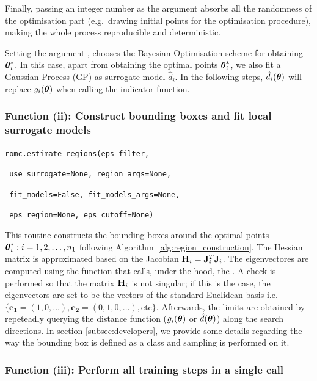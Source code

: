 Finally, passing an integer number as the argument 
absorbs all the randomness of the optimisation part (e.g.\ drawing
initial points for the optimisation procedure), making the whole
process reproducible and deterministic.

Setting the argument , chooses the Bayesian
Optimisation scheme for obtaining $\boldsymbol{\theta}_i^*$. In this case, apart
from obtaining the optimal points $\boldsymbol{\theta}_i^*$, we also fit a Gaussian
Process (GP) as surrogate model $\hat{d}_i$. In the following steps,
$\hat{d}_i(\boldsymbol{\theta})$ will replace $g_i(\boldsymbol{\theta})$ when calling the
indicator function.

\subsubsection*{Function (ii): Construct bounding boxes and fit local surrogate models}

\texttt{romc.estimate_regions(eps_filter,}
  
      \texttt{                      use_surrogate=None, region_args=None,}
  
      \texttt{                      fit_models=False, fit_models_args=None,}
  
      \texttt{                      eps_region=None, eps_cutoff=None)}
\vspace{5mm}

This routine constructs the bounding boxes around the optimal points
$\boldsymbol{\theta}_i^* : i = 1, 2, \ldots, n_1$ following
Algorithm~\ref{alg:region_construction}. The Hessian matrix is
approximated based on the Jacobian $\mathbf{H}_i = \mathbf{J}_i^T \mathbf{J}_i$. The
eigenvectores are computed using the function
 that calls, under the hood, the
. A check is performed so that the matrix
$\mathbf{H}_i$ is not singular; if this is the case, the eigenvectors are
set to be the vectors of the standard Euclidean basis i.e.\
$\{ \mathbf{e_1} = (1, 0, \ldots), \mathbf{e_2} = (0,1,0,\ldots),
\text{etc} \}$. Afterwards, the limits are obtained by repeteadly querying
the distance function ($g_i(\boldsymbol{\theta})$ or $\hat{d}(\boldsymbol{\theta})$) along the
search directions. In section \ref{subsec:developers}, we provide some
details regarding the way the bounding box is defined as a class and
sampling is performed on it.

\subsubsection*{Function (iii): Perform all training steps in a single call}

